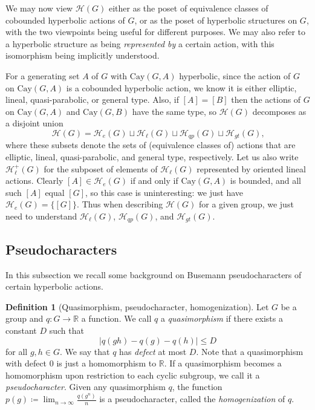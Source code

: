 \documentclass[10pt,a4paper]{article}
\theoremstyle{definition}
\newtheorem{defi}[cdrthm]{Definition}
\theoremstyle{remark}
\newcommand{\R}{\mathbb{R}}
\newcommand{\Hyp}{\mathcal{H}}
\newcommand{\Cay}{\mathrm{Cay}}
\theoremstyle{plain}
\begin{document}
We may now view $\Hyp(G)$ either as the poset of equivalence classes of cobounded hyperbolic actions of $G$, or as the poset of hyperbolic structures on $G$, with the two viewpoints being useful for different purposes. We may also refer to a hyperbolic structure as being \emph{represented by} a certain action, with this isomorphism being implicitly understood. 

For a generating set $A$ of $G$ with $\Cay(G,A)$ hyperbolic, since the action of $G$ on $\Cay(G,A)$ is a cobounded hyperbolic action, we know it is either elliptic, lineal, quasi-parabolic, or general type. Also, if $[A]=[B]$ then the actions of $G$ on $\Cay(G,A)$ and $\Cay(G,B)$ have the same type, so $\Hyp(G)$ decomposes as a disjoint union
\[
\Hyp(G) = \Hyp_e(G) \sqcup \Hyp_\ell(G) \sqcup \Hyp_{qp}(G) \sqcup \Hyp_{gt}(G)\text{,}
\]
where these subsets denote the sets of (equivalence classes of) actions that are elliptic, lineal, quasi-parabolic, and general type, respectively. Let us also write $\Hyp_\ell^+(G)$ for the subposet of elements of $\Hyp_\ell(G)$ represented by oriented lineal actions. Clearly $[A]\in\Hyp_e(G)$ if and only if $\Cay(G,A)$ is bounded, and all such $[A]$ equal $[G]$, so this case is uninteresting: we just have $\Hyp_e(G)=\{[G]\}$. Thus when describing $\Hyp(G)$ for a given group, we just need to understand $\Hyp_\ell(G)$, $\Hyp_{qp}(G)$, and $\Hyp_{gt}(G)$.


\subsection{Pseudocharacters}\label{ssec:pseudochars}

In this subsection we recall some background on Busemann pseudocharacters of certain hyperbolic actions.

\begin{defi}[Quasimorphism, pseudocharacter, homogenization]
Let $G$ be a group and $q\colon G\to\R$ a function. We call $q$ a \emph{quasimorphism} if there exists a constant $D$ such that
\[
|q(gh)-q(g)-q(h)|\le D
\]
for all $g,h\in G$. We say that $q$ has \emph{defect} at most $D$. Note that a quasimorphism with defect $0$ is just a homomorphism to $\R$. If a quasimorphism becomes a homomorphism upon restriction to each cyclic subgroup, we call it a \emph{pseudocharacter}. Given any quasimorphism $q$, the function $p(g)\coloneqq \displaystyle \lim_{n\to\infty}\frac{q(g^n)}{n}$ is a pseudocharacter, called the \emph{homogenization} of $q$.
\end{defi}
\end{document}
